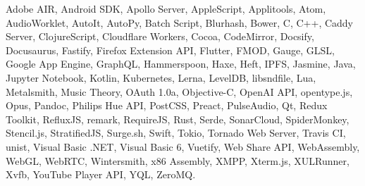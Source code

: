 \documentclass[a4paper]{article}
\begin{document}
Adobe AIR, Android SDK, Apollo Server, AppleScript, Applitools, Atom, AudioWorklet, AutoIt, AutoPy, Batch Script, Blurhash, Bower, C, C++, Caddy Server, ClojureScript, Cloudflare Workers, Cocoa, CodeMirror, Docsify, Docusaurus, Fastify, Firefox Extension API, Flutter, FMOD, Gauge, GLSL, Google App Engine, GraphQL, Hammerspoon, Haxe, Heft, IPFS, Jasmine, Java, Jupyter Notebook, Kotlin, Kubernetes, Lerna, LevelDB, libsndfile, Lua, Metalsmith, Music Theory, OAuth 1.0a, Objective-C, OpenAI API, opentype.js, Opus, Pandoc, Philips Hue API, PostCSS, Preact, PulseAudio, Qt, Redux Toolkit, RefluxJS, remark, RequireJS, Rust, Serde, SonarCloud, SpiderMonkey, Stencil.js, StratifiedJS, Surge.sh, Swift, Tokio, Tornado Web Server, Travis CI, unist, Visual Basic .NET, Visual Basic 6, Vuetify, Web Share API, WebAssembly, WebGL, WebRTC, Wintersmith, x86 Assembly, XMPP, Xterm.js, XULRunner, Xvfb, YouTube Player API, YQL, ZeroMQ.

\vspace{2mm}





\ 
\end{document}
